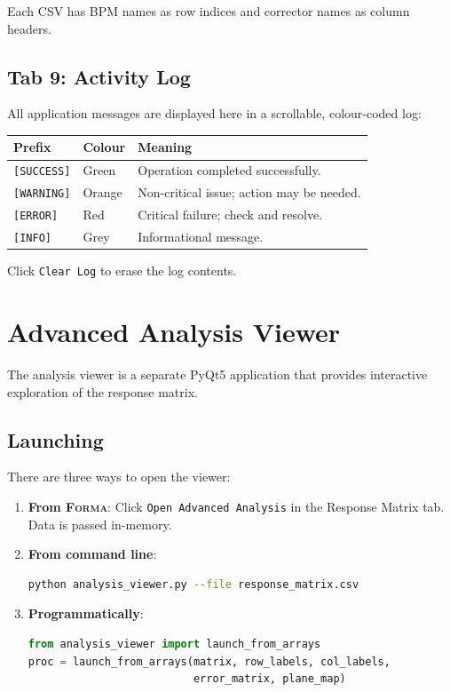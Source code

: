 \documentclass[11pt,a4paper,twoside]{report}
\newcommand{\forma}{\textsc{Forma}}
\newcommand{\btn}[1]{\colorbox{accent!12}{\texttt{\small #1}}}
\begin{document}
Each CSV has BPM names as row indices and corrector names as column headers.

\section{Tab 9: Activity Log}\label{sec:tab9}

All application messages are displayed here in a scrollable, colour-coded log:

\begin{tabularx}{\textwidth}{lll}
  \toprule
  \textbf{Prefix} & \textbf{Colour} & \textbf{Meaning} \\
  \midrule
  \texttt{[SUCCESS]} & \textcolor{accent2}{Green}    & Operation completed successfully. \\
  \texttt{[WARNING]} & \textcolor{warncol}{Orange}   & Non-critical issue; action may be needed. \\
  \texttt{[ERROR]}   & \textcolor{dangercol}{Red}    & Critical failure; check and resolve. \\
  \texttt{[INFO]}    & Grey                           & Informational message. \\
  \bottomrule
\end{tabularx}

Click \btn{Clear Log} to erase the log contents.


\chapter{Advanced Analysis Viewer}\label{ch:analysis}

The analysis viewer is a separate PyQt5 application that provides interactive exploration of the response matrix.

\section{Launching}

There are three ways to open the viewer:

\begin{enumerate}
  \item \textbf{From \forma{}}: Click \btn{Open Advanced Analysis} in the Response Matrix tab. Data is passed in-memory.
  \item \textbf{From command line}:
    \begin{lstlisting}[language=bash]
python analysis_viewer.py --file response_matrix.csv
    \end{lstlisting}
  \item \textbf{Programmatically}:
    \begin{lstlisting}[language=Python]
from analysis_viewer import launch_from_arrays
proc = launch_from_arrays(matrix, row_labels, col_labels,
                          error_matrix, plane_map)
    \end{lstlisting}
\end{enumerate}
\end{document}
